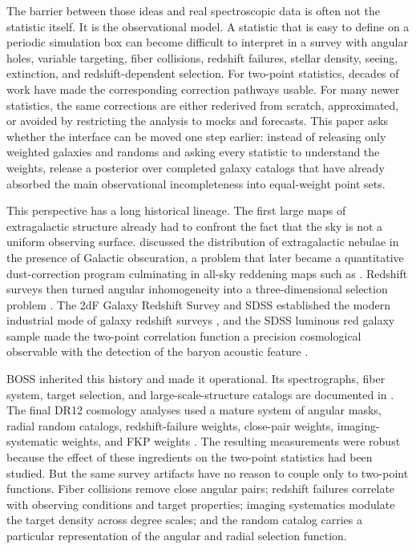 \documentclass[apj]{emulateapj}
\begin{document}
The barrier between those ideas and real spectroscopic data is often not the
statistic itself.  It is the observational model.  A statistic that is easy to
define on a periodic simulation box can become difficult to interpret in a
survey with angular holes, variable targeting, fiber collisions, redshift
failures, stellar density, seeing, extinction, and redshift-dependent selection.
For two-point statistics, decades of work have made the corresponding
correction pathways usable.  For many newer statistics, the same corrections
are either rederived from scratch, approximated, or avoided by restricting the
analysis to mocks and forecasts.  This paper asks whether the interface can be
moved one step earlier: instead of releasing only weighted galaxies and
randoms and asking every statistic to understand the weights, release a
posterior over completed galaxy catalogs that have already absorbed the main
observational incompleteness into equal-weight point sets.

This perspective has a long historical lineage.  The first large maps of
extragalactic structure already had to confront the fact that the sky is not a
uniform observing surface.  \citet{Hubble1934} discussed the distribution of
extragalactic nebulae in the presence of Galactic obscuration, a problem that
later became a quantitative dust-correction program culminating in all-sky
reddening maps such as \citet{SFD1998}.  Redshift surveys then turned angular
inhomogeneity into a three-dimensional selection problem
\citep{DavisPeebles1983,deLapparent1986}.  The 2dF Galaxy Redshift Survey and
SDSS established the modern industrial mode of galaxy redshift surveys
\citep{York2000,Colless2001,Cole2005}, and the SDSS luminous red galaxy sample
made the two-point correlation function a precision cosmological observable
with the detection of the baryon acoustic feature \citep{Eisenstein2005}.

BOSS inherited this history and made it operational.  Its spectrographs,
fiber system, target selection, and large-scale-structure catalogs are
documented in \citet{Dawson2013,Smee2013,Reid2016}.  The final DR12 cosmology
analyses used a mature system of angular masks, radial random catalogs,
redshift-failure weights, close-pair weights, imaging-systematic weights, and
FKP weights \citep{Alam2017,Ross2017}.  The resulting measurements were robust
because the effect of these ingredients on the two-point statistics had been
studied.  But the same survey artifacts have no reason to couple only to
two-point functions.  Fiber collisions remove close angular pairs; redshift
failures correlate with observing conditions and target properties; imaging
systematics modulate the target density across degree scales; and the random
catalog carries a particular representation of the angular and radial selection
function.
\end{document}
